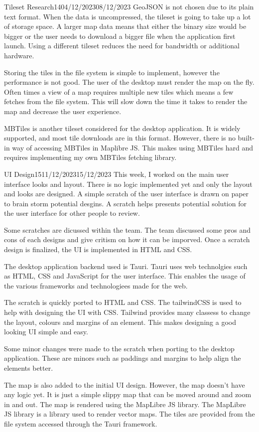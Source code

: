 \documentclass[12pt]{article}
\begin{document}
\begin{logbook-entry}{Tileset Research}{14}{04/12/2023}{08/12/2023}
GeoJSON is not chosen due to its plain text format.
When the data is uncompressed, the tileset is going to take up a lot of storage space.
A larger map data means that either the binary size would be bigger or the user needs to download a bigger file when the application first launch.
Using a different tileset reduces the need for bandwidth or additional hardware.

Storing the tiles in the file system is simple to implement, however the performance is not good.
The user of the desktop must render the map on the fly.
Often times a view of a map requires multiple new tiles which means a few fetches from the file system.
This will slow down the time it takes to render the map and decrease the user experience.

MBTiles is another tileset considered for the desktop application.
It is widely supported, and most tile downloads are in this format.
However, there is no built-in way of accessing MBTiles in Maplibre JS.
This makes using MBTiles hard and requires implementing my own MBTiles fetching library.
\end{logbook-entry}

\begin{logbook-entry}{UI Design}{15}{11/12/2023}{15/12/2023}
This week, I worked on the main user interface looks and layout.
There is no logic implemented yet and only the layout and looks are designed.
A simple scratch of the user interface is drawn on paper to brain storm potential desgins.
A scratch helps presents potential solution for the user interface for other people to review.

Some scratches are dicussed within the team.
The team discussed some pros and cons of each designs and give critism on how it can be imporved.
Once a scratch design is finalized, the UI is implemented in HTML and CSS.

The desktop application backend used is Tauri.
Tauri uses web technolgies such as HTML, CSS and JavaScript for the user interface.
This enables the usage of the various frameworks and technologiees made for the web.

The scratch is quickly ported to HTML and CSS.
The tailwindCSS is used to help with designing the UI with CSS.
Tailwind provides many classess to change the layout, colours and margins of an element.
This makes designing a good looking UI simple and easy.

Some minor changes were made to the scratch when porting to the desktop application.
These are minors such as paddings and margins to help align the elements better.

The map is also added to the initial UI design.
However, the map doesn't have any logic yet.
It is just a simple slippy map that can be moved around and zoom in and out.
The map is rendered using the MapLibre JS library.
The MapLibre JS library is a library used to render vector maps.
The tiles are provided from the file system accessed through the Tauri framework.
\end{logbook-entry}
\end{document}
